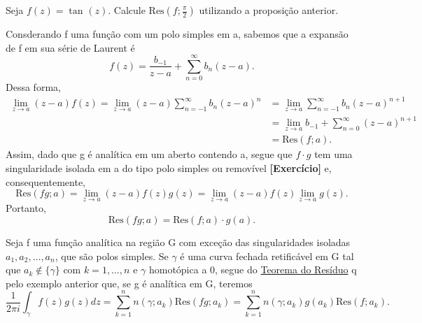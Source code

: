 \documentclass[ComplexAnalysis/complex.tex]{subfiles}
\begin{document}
\begin{exer*}
	Seja \(f(z) = \tan^{}{(z)}.\) Calcule \(\mathrm{Res}(f; \frac{\pi }{2})\) utilizando a proposição anterior.
\end{exer*}
\begin{example}
	Consderando f uma função com um polo simples em a, sabemos que a expansão de f em sua série de Laurent é
	\[
		f(z) = \frac{b_{-1}}{z-a} + \sum\limits_{n=0}^{\infty}b_{n}(z-a).
	\]
	Dessa forma,
	\begin{align*}
		\lim_{z\to a}(z-a)f(z) = \lim_{z\to a}(z-a)\sum\limits_{n=-1}^{\infty}b_{n}(z-a)^{n} & = \lim_{z\to a}\sum\limits_{n=-1}^{\infty}b_{n}(z-a)^{n+1}    \\
		                                                                                     & = \lim_{z\to a}b_{-1} + \sum\limits_{n=0}^{\infty}(z-a)^{n+1} \\
		                                                                                     & = \mathrm{Res}(f; a).
	\end{align*}
	Assim, dado que g é analítica em um aberto contendo a, segue que \(f \cdot g\) tem uma singularidade isolada em a do tipo polo simples
	ou removível \textbf{[Exercício]} e, consequentemente,
	\[
		\mathrm{Res}(fg; a) = \lim_{z\to a}(z-a)f(z)g(z) = \lim_{z\to a}(z-a)f(z)\lim_{z\to a}g(z).
	\]
	Portanto,
	\[
		\mathrm{Res}(fg; a) = \mathrm{Res}(f; a)\cdot g(a).
	\]
\end{example}
\begin{example}
	Seja f uma função analítica na região G com exceção das singularidades isoladas \(a_{1}, a_{2}, \dotsc , a_{n}\), que são polos simples.
	Se \(\gamma \) é uma curva fechada retificável em G tal que \(a_{k}\not\in \{\gamma \}\) com \(k=1,\dotsc ,n \) e \(\gamma \) homotópica a 0,
	segue do \hyperlink{residue}{Teorema do Resíduo} q pelo exemplo anterior que, se g é analítica em G, teremos
	\[
		\frac{1}{2\pi i}\int_{\gamma }^{}f(z)g(z)dz = \sum\limits_{k=1}^{n}n(\gamma ; a_{k})\mathrm{Res}(fg; a_{k}) = \sum\limits_{k=1}^{n}n(\gamma ; a_{k})g(a_{k})\mathrm{Res}(f; a_{k}).
	\]
\end{example}
\end{document}
